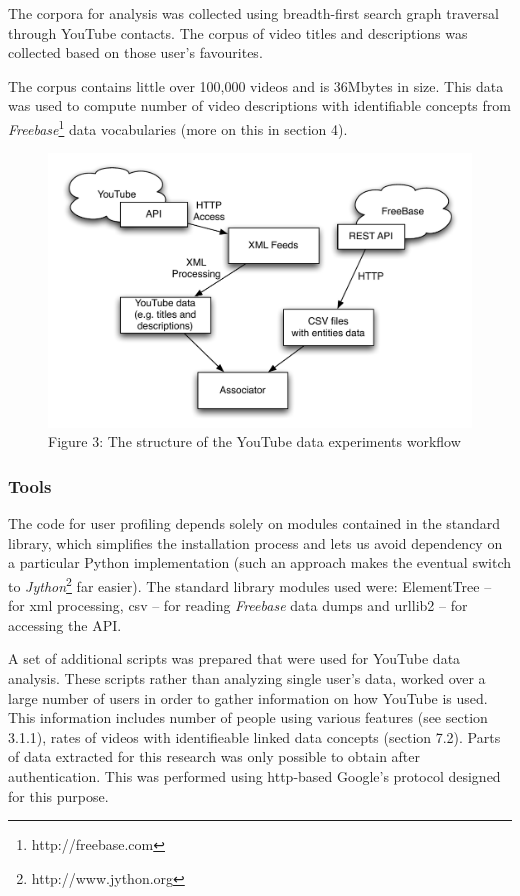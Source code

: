 The corpora for analysis was collected using breadth-first search graph
traversal through YouTube contacts. The corpus of video titles and descriptions
was collected based on those user's favourites.

The corpus contains little over 100,000 videos and is 36Mbytes in size. This
data was used to compute number of video descriptions with identifiable concepts from
\textit{Freebase}\footnote{http://freebase.com} data vocabularies (more on this in section 4).

\begin{figure}[h!]
  \begin{center}
	  \includegraphics[scale=0.65]{images/youtube_diagram.pdf} \\
	  Figure 3: The structure of the YouTube data experiments workflow
  \end{center}
\end{figure}

\subsubsection{Tools}

The code for user profiling depends solely on modules contained in the standard
library, which simplifies the installation process and lets us avoid dependency
on a particular Python implementation (such an approach makes the eventual
switch to \textit{Jython}\footnote{http://www.jython.org} far easier). The
standard library modules used were: ElementTree -- for xml processing, csv --
for reading \textit{Freebase} data dumps and urllib2 -- for accessing the API.

A set of additional scripts was prepared that were used for YouTube data
analysis. These scripts rather than analyzing single user's data, worked over a
large number of users in order to gather information on how YouTube is used.
This information includes number of people using various features (see section
3.1.1), rates of videos with identifieable linked data concepts (section 7.2).
Parts of data extracted for this research was only possible to obtain after
authentication. This was performed using http-based Google's protocol designed
for this purpose.
